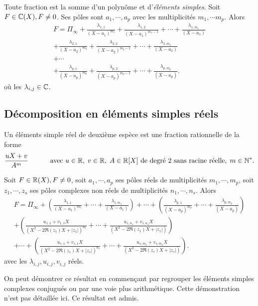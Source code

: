 Toute fraction est la somme d'un polynôme et d'\emph{éléments simples}.
Soit $F\in \mathbb{C}(X), F\neq 0$. Ses pôles sont $a_1, \cdots, a_p$ avec les multiplicités $m_1,\cdots m_p$. Alors
\begin{multline*}
 F = \Pi_\infty 
 + \frac{\lambda_{1,1}}{(X-a_1)^{m_1}} + \frac{\lambda_{1,2}}{(X-a_1)^{m_1-1}} + \cdots + \frac{\lambda_{1,m_1}}{(X-a_1)} \\
 + \frac{\lambda_{2,1}}{(X-a_2)^{m_2}} + \frac{\lambda_{2,2}}{(X-a_2)^{m_2-1}} + \cdots + \frac{\lambda_{2,m_2}}{(X-a_2)} \\
 + \cdots \\
 + \frac{\lambda_{p,1}}{(X-a_p)^{m_p}} + \frac{\lambda_{p,2}}{(X-a_p)^{m_p-1}} + \cdots + \frac{\lambda_{p,m_p}}{(X-a_p)}.
\end{multline*}
où les $\lambda_{i,j}\in \mathbb{C}$.

\subsection{Décomposition en éléments simples réels}
\begin{defi}
 Un éléments simple réel de deuxième espèce  est une fraction rationnelle de la forme
\begin{displaymath}
 \frac{u X + v}{A^m}\hspace{1cm} \text{ avec } u \in \mathbb{R},\; v \in\mathbb{R},\; A\in \mathbb{R}[X] \text{ de degré $2$ sans racine réelle}, \; m\in \mathbb{N}^*.
\end{displaymath}
\end{defi}
\begin{prop}
 Soit $F\in \mathbb{R}(X), F\neq 0$, soit $a_1,\cdots, a_p$ ses pôles réels de multiplicités $m_1,\cdots, m_p$, soit $z_1,\cdots, z_s$ ses pôles complexes non réels de multiplicités $n_1,\cdots, n_s$. Alors
\begin{multline*}
 F = \Pi_\infty 
 + \left( \frac{\lambda_{1,1}}{(X-a_1)^{m_1}}  + \cdots + \frac{\lambda_{1,m_1}}{(X-a_1)} \right) 
 + \cdots 
 + \left( \frac{\lambda_{p,1}}{(X-a_p)^{m_p}} + \cdots + \frac{\lambda_{p,m_p}}{(X-a_p)}\right)  \\
 + \left( \frac{u_{1,1} + v_{1,1}X}{(X^2-2\Re(z_1)X + |z_1|)^{n_1}} + \cdots + \frac{u_{1,n_1}+ v_{1,n_1}X}{(X^2-2\Re(z_1)X + |z_1|)}\right)  \\
 + \cdots 
 + \left( \frac{u_{s,1} + v_{s,1}X}{(X^2-2\Re(z_s)X + |z_s|)^{n_s}} + \cdots + \frac{u_{s,m_s}+ v_{s,m_s}X}{(X^2-2\Re(z_s)X + |z_s|)}\right) .
\end{multline*}
avec les $\lambda_{i,j}, u_{i,j}, v_{i,j}$ réels.
\end{prop}
\begin{demo}
 On peut démontrer ce résultat en commençant par regrouper les éléments simples complexes conjugués ou par une voie plus arithmétique. Cette démonstration n'est pas détaillée ici. Ce résultat est admis. 
\end{demo}


